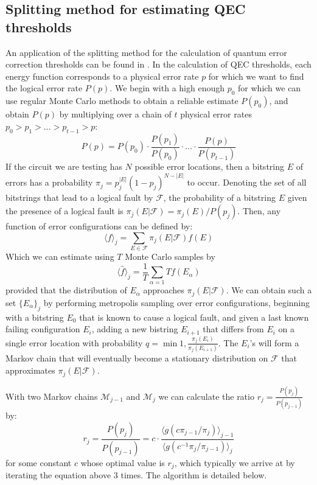 \subsection{Splitting method for estimating QEC thresholds}

An application of the splitting method for the calculation of quantum error correction thresholds can be found in \cite{beverland2025fail}.
In the calculation of QEC thresholds, each energy function corresponds to a physical error rate $p$ for which
we want to find the logical error rate $P(p)$. We begin with a high enough $p_0$ for which we can use regular
Monte Carlo methods to obtain a reliable estimate $P(p_0)$, and obtain $P(p)$ by multiplying over a chain of 
$t$ physical error rates $p_0>p_1>\ldots>p_{t-1}>p$:
$$ P(p) = P(p_0)\cdot\frac{P(p_1)}{P(p_0)}\cdot\ldots\cdot\frac{P(p)}{P(p_{t-1})}$$
If the circuit we are testing has $N$ possible error locations, then a bitstring $E$ of errors has a probability
$\pi_j=p_j^{|E|}(1-p_j)^{N-|E|}$ to occur. Denoting the set of all bitstrings that lead to a logical fault by $\mathcal{F}$,
the probability of a bitstring $E$ given the presence of a logical fault is $\pi_j(E|\mathcal{F})=\pi_j(E)/P(p_j)$.
Then, any function of error configurations can be defined by:
$$\langle f\rangle_j = \sum_{E\in\mathcal{F}} \pi_j(E|\mathcal{F}) f(E)$$
Which we can estimate using $T$ Monte Carlo samples by 
$$\langle \hat{f}\rangle_j = \frac{1}{T}\sum_{\alpha=1}{T}f(E_\alpha)$$
provided that the distribution of $E_\alpha$ approaches $\pi_j(E|\mathcal{F})$.
We can obtain such a set $\{E_\alpha\}_j$ by performing metropolis sampling over error configurations, beginning with
a bitstring $E_0$ that is known to cause a logical fault, and given a last known failing configuration $E_i$,
adding a new bistring $E_{i+1}$ that differs from $E_i$ on
a single error location with probability $q = \min{1, \frac{\pi_j(E_i)}{\pi_j(E_{i+1})}}$.
The $E_i$'s will form a Markov chain that will eventually become a stationary distribution on $\mathcal{F}$ that approximates $\pi_j(E|\mathcal{F})$.

With two Markov chains $\mathcal{M}_{j-1}$ and $\mathcal{M}_j$ we can calculate the ratio $r_j=\frac{P(p_j)}{P(p_{j-1})}$ by:
$$r_j = \frac{P(p_j)}{P(p_{j-1})}
= c \cdot \frac{\langle g(c\pi_{j-1}/\pi_j)\rangle_{j-1}}
{\langle g(c^{-1}\pi_j/\pi_{j-1})\rangle_j}$$
for some constant $c$ whose optimal value is $r_j$, which typically we arrive at by iterating the equation above 3 times.
The algorithm is detailed below.










